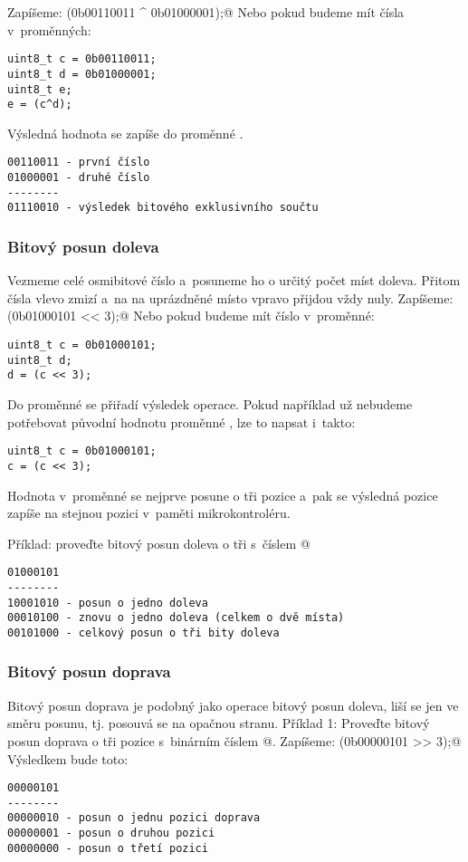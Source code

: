Zapíšeme:
\verb@(0b00110011 ^ 0b01000001);@
Nebo pokud budeme mít čísla v~proměnných:
\begin{verbatim}
uint8_t c = 0b00110011;
uint8_t d = 0b01000001;
uint8_t e;
e = (c^d);
\end{verbatim}
Výsledná hodnota se zapíše do proměnné \verb@e@.
\begin{verbatim}
00110011 - první číslo
01000001 - druhé číslo
--------
01110010 - výsledek bitového exklusivního součtu
\end{verbatim}

\subsubsection{Bitový posun doleva} 
Vezmeme celé osmibitové číslo a~posuneme ho o určitý počet míst doleva. Přitom čísla vlevo zmizí a~na na uprázdněné místo vpravo přijdou vždy nuly.
Zapíšeme:
\verb@(0b01000101 << 3);@
Nebo pokud budeme mít číslo v~proměnné:
\begin{verbatim}
uint8_t c = 0b01000101;
uint8_t d;
d = (c << 3);
\end{verbatim}
Do proměnné \verb@d@ se přiřadí výsledek operace.
Pokud například už nebudeme potřebovat původní hodnotu proměnné \verb@c@, lze to napsat i~takto:
\begin{verbatim}
uint8_t c = 0b01000101;
c = (c << 3);
\end{verbatim}
Hodnota v~proměnné \verb@c@ se nejprve posune o tři pozice a~pak se výsledná pozice zapíše na stejnou pozici v~paměti mikrokontroléru.

Příklad: proveďte bitový posun doleva o tři s~číslem @

\begin{verbatim}
01000101
--------
10001010 - posun o jedno doleva 
00010100 - znovu o jedno doleva (celkem o dvě místa)
00101000 - celkový posun o tři bity doleva 
\end{verbatim}

\subsubsection{Bitový posun doprava}
Bitový posun doprava je podobný jako operace bitový posun doleva, liší se jen ve směru posunu, tj. posouvá se na opačnou stranu.
Příklad 1: Proveďte bitový posun doprava o tři pozice s~binárním číslem @. Zapíšeme:
\verb@(0b00000101 >> 3);@
Výsledkem bude toto:
\begin{verbatim}
00000101
--------
00000010 - posun o jednu pozici doprava
00000001 - posun o druhou pozici
00000000 - posun o třetí pozici
\end{verbatim}

